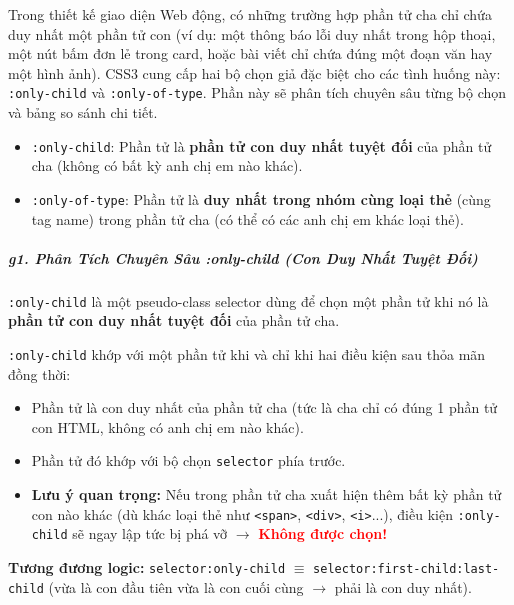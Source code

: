 \documentclass[11pt,oneside]{book}
\newcommand{\codeinline}[1]{\textcolor{accentOrange}{\texttt{#1}}}
\begin{document}
Trong thiết kế giao diện Web động, có những trường hợp phần tử cha chỉ chứa duy nhất một phần tử con (ví dụ: một thông báo lỗi duy nhất trong hộp thoại, một nút bấm đơn lẻ trong card, hoặc bài viết chỉ chứa đúng một đoạn văn hay một hình ảnh). CSS3 cung cấp hai bộ chọn giả đặc biệt cho các tình huống này: \codeinline{:only-child} và \codeinline{:only-of-type}. Phần này sẽ phân tích chuyên sâu từng bộ chọn và bảng so sánh chi tiết.

\begin{conceptBox}
\begin{itemize}[leftmargin=1.5em, itemsep=3pt, parsep=0pt]
    \item \codeinline{:only-child}: Phần tử là \textbf{phần tử con duy nhất tuyệt đối} của phần tử cha (không có bất kỳ anh chị em nào khác).
    \item \codeinline{:only-of-type}: Phần tử là \textbf{duy nhất trong nhóm cùng loại thẻ} (cùng tag name) trong phần tử cha (có thể có các anh chị em khác loại thẻ).
\end{itemize}
\end{conceptBox}


\subparagraph{g1. Phân Tích Chuyên Sâu :only-child (Con Duy Nhất Tuyệt Đối)}

\codeinline{:only-child} là một pseudo-class selector dùng để chọn một phần tử khi nó là \textbf{phần tử con duy nhất tuyệt đối} của phần tử cha.

\begin{conceptBox}
\codeinline{:only-child} khớp với một phần tử khi và chỉ khi hai điều kiện sau thỏa mãn đồng thời:
\begin{itemize}[leftmargin=1.5em, itemsep=2pt, parsep=0pt]
    \item Phần tử là con duy nhất của phần tử cha (tức là cha chỉ có đúng 1 phần tử con HTML, không có anh chị em nào khác).
    \item Phần tử đó khớp với bộ chọn \codeinline{selector} phía trước.
    \item \textbf{Lưu ý quan trọng:} Nếu trong phần tử cha xuất hiện thêm bất kỳ phần tử con nào khác (dù khác loại thẻ như \codeinline{<span>}, \codeinline{<div>}, \codeinline{<i>}...), điều kiện \codeinline{:only-child} sẽ ngay lập tức bị phá vỡ $\rightarrow$ \textcolor{red}{\textbf{Không được chọn!}}
\end{itemize}
\par\vspace{4pt}
\textbf{Tương đương logic:} \codeinline{selector:only-child} $\equiv$ \codeinline{selector:first-child:last-child} (vừa là con đầu tiên vừa là con cuối cùng $\rightarrow$ phải là con duy nhất).
\end{conceptBox}
\end{document}
